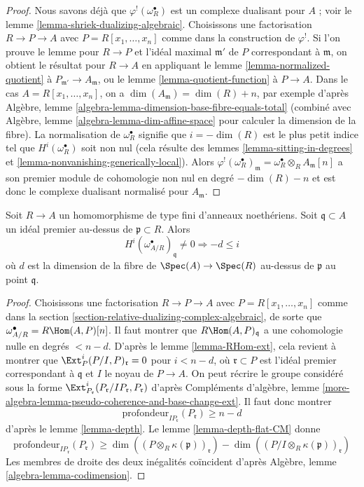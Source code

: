 \begin{proof}
Nous savons déjà que $\varphi^!(\omega_R^\bullet)$ est un complexe dualisant pour $A$ ; voir le lemme \ref{lemma-shriek-dualizing-algebraic}.
Choisissons une factorisation $R \to P \to A$ avec $P = R[x_1, \ldots, x_n]$ comme dans la construction de $\varphi^!$.
Si l'on prouve le lemme pour $R \to P$ et l'idéal maximal $\mathfrak m'$ de $P$
correspondant à $\mathfrak m$, on obtient le résultat pour $R \to A$
en appliquant le lemme \ref{lemma-normalized-quotient} à $P_{\mathfrak m'} \to A_\mathfrak m$,
ou le lemme \ref{lemma-quotient-function} à $P \to A$.
Dans le cas $A = R[x_1, \ldots, x_n]$, on a $\dim(A_\mathfrak m) = \dim(R) + n$, par exemple d'après Algèbre, lemme \ref{algebra-lemma-dimension-base-fibre-equals-total}
(combiné avec Algèbre, lemme \ref{algebra-lemma-dim-affine-space} pour calculer la dimension de la fibre).
La normalisation de $\omega_R^\bullet$ signifie que $i = -\dim(R)$ est le plus petit indice
tel que $H^i(\omega_R^\bullet)$ soit non nul (cela résulte des lemmes \ref{lemma-sitting-in-degrees} et \ref{lemma-nonvanishing-generically-local}).
Alors $\varphi^!(\omega_R^\bullet)_\mathfrak m =
\omega_R^\bullet \otimes_R A_\mathfrak m[n]$ a son premier module de cohomologie non nul en degré $-\dim(R) - n$
et est donc le complexe dualisant normalisé pour $A_\mathfrak m$.
\end{proof}

\begin{lemma}
\label{lemma-relative-dualizing-trivial-vanishing}
Soit $R \to A$ un homomorphisme de type fini d'anneaux noethériens.
Soit $\mathfrak q \subset A$ un idéal premier au-dessus de $\mathfrak p \subset R$. Alors
$$
H^i(\omega_{A/R}^\bullet)_\mathfrak q \not = 0
\Rightarrow - d \leq i
$$
où $d$ est la dimension de la fibre de $\Spec(A) \to \Spec(R)$ au-dessus de $\mathfrak p$ au point $\mathfrak q$.
\end{lemma}

\begin{proof}
Choisissons une factorisation $R \to P \to A$ avec $P = R[x_1, \ldots, x_n]$ comme dans la section \ref{section-relative-dualizing-complex-algebraic},
de sorte que $\omega_{A/R}^\bullet = R\Hom(A, P)[n]$. Il faut montrer que $R\Hom(A, P)_\mathfrak q$
a une cohomologie nulle en degrés $< n - d$.
D'après le lemme \ref{lemma-RHom-ext}, cela revient à montrer que $\Ext_P^i(P/I, P)_{\mathfrak r} = 0$ pour $i < n - d$,
où $\mathfrak r \subset P$ est l'idéal premier correspondant à $\mathfrak q$
et $I$ le noyau de $P \to A$.
On peut récrire le groupe considéré sous la forme $\Ext_{P_\mathfrak r}^i(P_\mathfrak r/IP_\mathfrak r, P_\mathfrak r)$
d'après Compléments d'algèbre, lemme \ref{more-algebra-lemma-pseudo-coherence-and-base-change-ext}.
Il faut donc montrer
$$
\text{profondeur}_{IP_\mathfrak r}(P_\mathfrak r) \geq n - d
$$
d'après le lemme \ref{lemma-depth}. Le lemme \ref{lemma-depth-flat-CM} donne
$$
\text{profondeur}_{IP_\mathfrak r}(P_\mathfrak r) \geq
\dim((P \otimes_R \kappa(\mathfrak p))_\mathfrak r) -
\dim((P/I \otimes_R \kappa(\mathfrak p))_\mathfrak r)
$$
Les membres de droite des deux inégalités coïncident
d'après Algèbre, lemme \ref{algebra-lemma-codimension}.
\end{proof}

